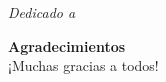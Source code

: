 \newpage %
\thispagestyle{empty} %

\begin{flushright}
\textit{Dedicado a \\}
\end{flushright}

\newpage %
\thispagestyle{empty} %

\textbf{\Huge{Agradecimientos}}\\
 
¡Muchas gracias a todos!

\newpage %
\thispagestyle{empty} %

\tableofcontents %
\listoffigures %
\listoftables %
\lstlistoflistings %



\newpage %
\mainmatter %


